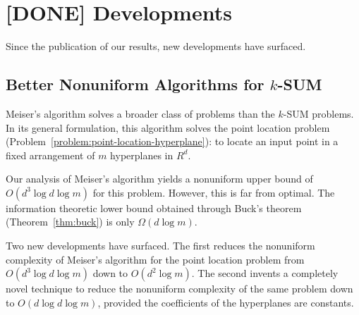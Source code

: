 \chapter{[DONE] Developments}\label{chapter:developments}

Since the publication of our results, new developments have surfaced.

\section{Better Nonuniform Algorithms for \(k\)-SUM}

Meiser's algorithm solves a broader class of problems than the \(k\)-SUM
problems. In its general formulation, this algorithm solves
the point location problem (Problem~\ref{problem:point-location-hyperplane}):
to locate an input point in a fixed arrangement of $m$ hyperplanes in $R^d$.

Our analysis of Meiser's algorithm yields a nonuniform upper bound of \(O(d^3 \log
d \log m)\) for this problem. However, this is far from optimal.
The information theoretic lower bound obtained through
Buck's theorem (Theorem~\ref{thm:buck}) is only \(\Omega(d \log m)\).






Two new developments have surfaced.
%
The first reduces the nonuniform complexity of Meiser's algorithm for the point
location problem from
\(O(d^3 \log d \log m)\) down to \(O(d^2 \log m)\).
%
The second invents a completely novel technique to reduce the nonuniform
complexity of the same problem down to \(O(d \log d \log m)\), provided the
coefficients of the hyperplanes are constants.

